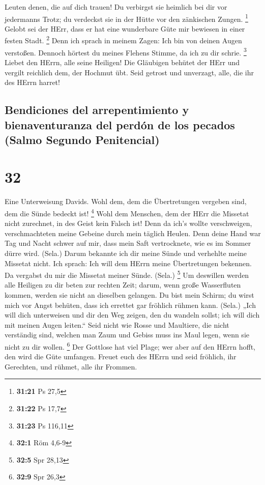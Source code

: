 Leuten denen, die auf dich trauen!  Du verbirgst sie
heimlich bei dir vor jedermanns Trotz; du verdeckst sie in der Hütte vor
den zänkischen Zungen. \footnote{\textbf{31:21} Ps 27,5} 
Gelobt sei der HErr, dass er hat eine wunderbare Güte mir bewiesen in
einer festen Stadt. \footnote{\textbf{31:22} Ps 17,7} 
Denn ich sprach in meinem Zagen: Ich bin von deinen Augen verstoßen.
Dennoch hörtest du meines Flehens Stimme, da ich zu dir schrie.
\footnote{\textbf{31:23} Ps 116,11}  Liebet den HErrn,
alle seine Heiligen! Die Gläubigen behütet der HErr und vergilt
reichlich dem, der Hochmut übt.  Seid getrost und
unverzagt, alle, die ihr des HErrn harret!

\hypertarget{bendiciones-del-arrepentimiento-y-bienaventuranza-del-perduxf3n-de-los-pecados-salmo-segundo-penitencial}{%
\subsection{Bendiciones del arrepentimiento y bienaventuranza del perdón
de los pecados (Salmo Segundo
Penitencial)}\label{bendiciones-del-arrepentimiento-y-bienaventuranza-del-perduxf3n-de-los-pecados-salmo-segundo-penitencial}}

\hypertarget{section-31}{%
\section{32}\label{section-31}}

 Eine Unterweisung Davids. Wohl dem, dem die Übertretungen
vergeben sind, dem die Sünde bedeckt ist! \footnote{\textbf{32:1} Röm
  4,6-9}  Wohl dem Menschen, dem der HErr die Missetat
nicht zurechnet, in des Geist kein Falsch ist!  Denn da
ich's wollte verschweigen, verschmachteten meine Gebeine durch mein
täglich Heulen.  Denn deine Hand war Tag und Nacht schwer
auf mir, dass mein Saft vertrocknete, wie es im Sommer dürre wird.
(Sela.)  Darum bekannte ich dir meine Sünde und verhehlte
meine Missetat nicht. Ich sprach: Ich will dem HErrn meine Übertretungen
bekennen. Da vergabst du mir die Missetat meiner Sünde. (Sela.)
\footnote{\textbf{32:5} Spr 28,13}  Um deswillen werden
alle Heiligen zu dir beten zur rechten Zeit; darum, wenn große
Wasserfluten kommen, werden sie nicht an dieselben gelangen.
 Du bist mein Schirm; du wirst mich vor Angst behüten,
dass ich errettet gar fröhlich rühmen kann. (Sela.)  „Ich
will dich unterweisen und dir den Weg zeigen, den du wandeln sollst; ich
will dich mit meinen Augen leiten.``  Seid nicht wie Rosse
und Maultiere, die nicht verständig sind, welchen man Zaum und Gebiss
muss ins Maul legen, wenn sie nicht zu dir wollen. \footnote{\textbf{32:9}
  Spr 26,3}  Der Gottlose hat viel Plage; wer aber auf
den HErrn hofft, den wird die Güte umfangen.  Freuet euch
des HErrn und seid fröhlich, ihr Gerechten, und rühmet, alle ihr
Frommen.

